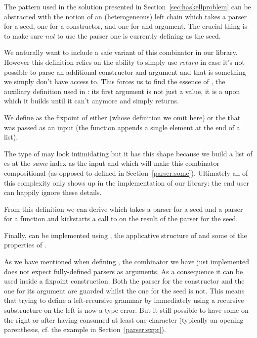 The pattern used in the solution presented in Section~\ref{sec:haskellproblem}
can be abstracted with the notion of an (heterogeneous) left chain which takes
a parser for a seed, one for a constructor, and one for and argument. The crucial
thing is to make sure \emph{not} to use the parser one is currently defining as
the seed.


We naturally want to include a safe variant of this combinator in our
library. However this definition relies on the ability to simply use
\textit{return} in case it's not possible to parse an additional
constructor and argument and that is something we simply don't have
access to. This forces us to find the essence of , the
auxiliary definition used in : its first argument is
not just a value, it is a  upon which it builds until it
can't anymore and simply returns.

We define  as the fixpoint of either  (whose
definition we omit here) or the  that was passed as an
input (the function  appends a single element at the
end of a list).


The type of  may look intimidating but it has this shape because
we build a list of es at the \emph{same} index as the input
 and  which will make this combinator compositional
(as opposed to  defined in Section~\ref{parser:some}). Ultimately
all of this complexity only shows up in the implementation of our library:
the end user can happily ignore these details.

From this definition we can derive  which takes a parser for
a seed and a parser for a function and kickstarts a call to 
on the result of the parser for the seed.


Finally,  can be implemented using , the applicative
structure of  and some of the properties of \BOX{}.


As we have mentioned when defining , the combinator 
we have just implemented does not expect fully-defined parsers as arguments.
As a consequence it can be used inside a fixpoint construction. Both the parser
for the constructor and the one for its  argument are guarded whilst the
one for the  seed is not. This means that trying to define a left-recursive
grammar by immediately using a recursive substructure on the left is now a type
error. But it still possible to have some on the right or after having consumed
at least one character (typically an opening parenthesis, cf. the 
example in Section~\ref{parser:expr}).

